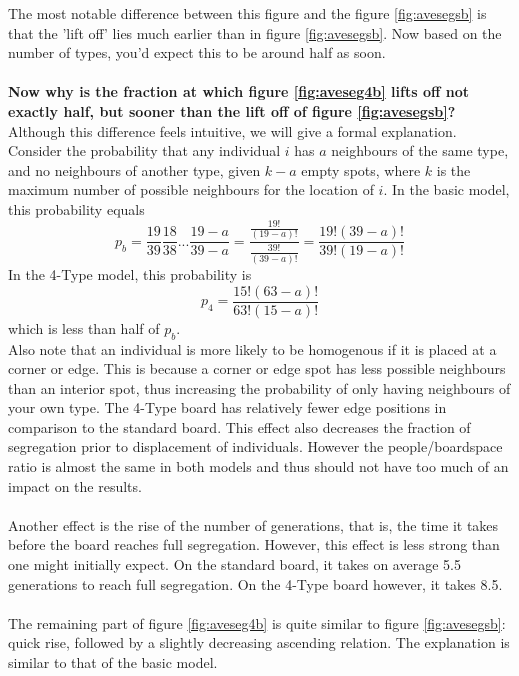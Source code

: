 The most notable difference between this figure and the figure \ref{fig:avesegsb} is that the 'lift off' lies much earlier than in figure \ref{fig:avesegsb}. Now based on the number of types, you'd expect this to be around half as soon.\\\\
\textbf{Now why is the fraction at which figure \ref{fig:aveseg4b} lifts off not exactly half, but sooner than the lift off of figure \ref{fig:avesegsb}?}
Although this difference feels intuitive, we will give a formal explanation. Consider the probability that any individual $i$ has $a$ neighbours of the same type, and no neighbours of another type, given $k-a$ empty spots, where $k$ is the maximum number of possible neighbours for the location of $i$. In the basic model, this probability equals
\[
p_b = \frac{19}{39}\frac{18}{38}...\frac{19-a}{39-a} = \frac{\frac{19!}{(19-a)!}}{\frac{39!}{(39-a)!}} = \frac{19!(39-a)!}{39!(19-a)!}
\]
In the 4-Type model, this probability is
\[
p_4 = \frac{15!(63-a)!}{63!(15-a)!}
\]
which is less than half of $p_b$.\\
Also note that an individual is more likely to be homogenous if it is placed at a corner or edge. This is because a corner or edge spot has less possible neighbours than an interior spot, thus increasing the probability of only having neighbours of your own type. The 4-Type board has relatively fewer edge positions in comparison to the standard board. This effect also decreases the fraction of segregation prior to displacement of individuals.
However the people/boardspace ratio is almost the same in both models and thus should not have too much of an impact on the results.\\
\\
Another effect is the rise of the number of generations, that is, the time it takes before the board reaches full segregation. However, this effect is less strong than one might initially expect. On the standard board, it takes on average 5.5 generations to reach full segregation. On the 4-Type board however, it takes 8.5.\\
\\
The remaining part of figure \ref{fig:aveseg4b} is quite similar to figure \ref{fig:avesegsb}: quick rise, followed by a slightly decreasing ascending relation. The explanation is similar to that of the basic model.

